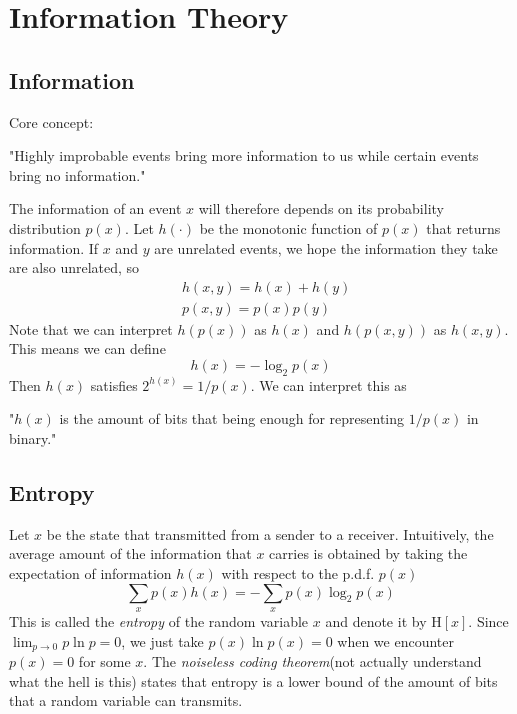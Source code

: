 \documentclass{article}
\begin{document}
    \section{Information Theory}
        \subsection{Information}
            Core concept:
            \begin{displayquote}
                "Highly improbable events bring more information to us while certain events bring no information."
            \end{displayquote}
            
            The information of an event $x$ will therefore depends on its probability distribution $p(x)$. Let $h(\cdot)$ be the monotonic function of $p(x)$ that returns information. If $x$ and $y$ are unrelated events, we hope the information they take are also unrelated, so
            \begin{align*}
                &h(x,y)=h(x) + h(y)\\
                &p(x,y)=p(x)p(y)
            \end{align*}
            Note that we can interpret $h(p(x))$ as $h(x)$ and $h(p(x, y))$ as $h(x, y)$. 
            This means we can define
            \[
                h(x)=-\log_2p(x)
            \]
            Then $h(x)$ satisfies $2^{h(x)}=1/p(x)$. We can interpret this as
            \begin{displayquote}
                "$h(x)$ is the amount of bits that being enough for representing $1/p(x)$ in binary."
            \end{displayquote}
        \subsection{Entropy}
            Let $x$ be the state that transmitted from a sender to a receiver.
            Intuitively, the average amount of the information that $x$ carries is obtained by taking the expectation of information $h(x)$ with respect to the p.d.f. $p(x)$
            \[
                \sum_x p(x)h(x)=-\sum_x p(x)\log_2p(x)
            \]
            This is called the \textit{entropy} of the random variable $x$ and denote it by $\mathrm{H}[x]$. Since $\lim_{p\rightarrow0}p\ln p=0$, we just take $p(x)\ln p(x)=0$ when we encounter $p(x)=0$ for some $x$. The \textit{noiseless coding theorem}(not actually understand what the hell is this) states that entropy is a lower bound of the amount of bits that a random variable can transmits.
            
\end{document}
